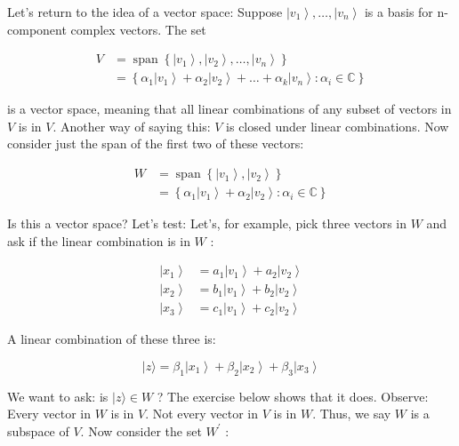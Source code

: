 \documentclass[main.tex]{subfiles}
\begin{document}
    Let's return to the idea of a vector space: Suppose $\left|v_{1}\right\rangle, \ldots,\left|v_{n}\right\rangle$ is a basis for $\mathrm{n}$-component complex vectors. The set
    
    $$
    \begin{aligned}
    V &=\operatorname{span}\left\{\left|v_{1}\right\rangle,\left|v_{2}\right\rangle, \ldots,\left|v_{n}\right\rangle\right\} \\
    &=\left\{\alpha_{1}\left|v_{1}\right\rangle+\alpha_{2}\left|v_{2}\right\rangle+\ldots+\alpha_{k}\left|v_{n}\right\rangle: \alpha_{i} \in \mathbb{C}\right\}
    \end{aligned}
    $$
    
    is a vector space, meaning that all linear combinations of any subset of vectors in $V$ is in $V$. Another way of saying this: $V$ is closed under linear combinations. Now consider just the span of the first two of these vectors:
    
    $$
    \begin{aligned}
    W &=\operatorname{span}\left\{\left|v_{1}\right\rangle,\left|v_{2}\right\rangle\right\} \\
    &=\left\{\alpha_{1}\left|v_{1}\right\rangle+\alpha_{2}\left|v_{2}\right\rangle: \alpha_{i} \in \mathbb{C}\right\}
    \end{aligned}
    $$
    
    Is this a vector space? Let's test: Let's, for example, pick three vectors in $W$ and ask if the linear combination is in $W$ :

    $$
    \begin{aligned}
    \left|x_{1}\right\rangle &=a_{1}\left|v_{1}\right\rangle+a_{2}\left|v_{2}\right\rangle \\
    \left|x_{2}\right\rangle &=b_{1}\left|v_{1}\right\rangle+b_{2}\left|v_{2}\right\rangle \\
    \left|x_{3}\right\rangle &=c_{1}\left|v_{1}\right\rangle+c_{2}\left|v_{2}\right\rangle
    \end{aligned}
    $$
    
    A linear combination of these three is:
    
    $$
    |z\rangle=\beta_{1}\left|x_{1}\right\rangle+\beta_{2}\left|x_{2}\right\rangle+\beta_{3}\left|x_{3}\right\rangle
    $$
    
    We want to ask: is $|z\rangle \in W$ ? The exercise below shows that it does. Observe: Every vector in $W$ is in $V$. Not every vector in $V$ is in $W$. Thus, we say $W$ is a subspace of $V$. Now consider the set $W^{\prime}$ :
    
\end{document}
